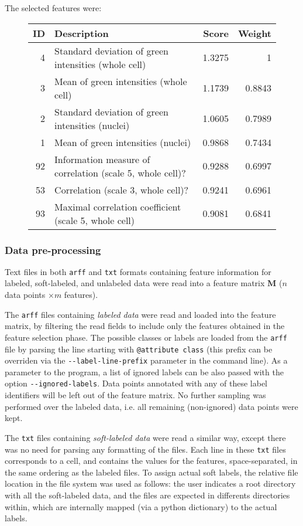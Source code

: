 \documentclass[oneside, a4paper, draft]{memoir} %
\begin{document}
The selected features were: 

\begin{figure}[here]
\centering
\begin{tabular}{rlrr}
	ID & Description & Score & Weight\\
	\hline
	4 & Standard deviation of green intensities (whole cell) & 1.3275 & 1\\
	3 & Mean of green intensities (whole cell) & 1.1739 & 0.8843\\
	2 & Standard deviation of green intensities (nuclei) & 1.0605 & 0.7989\\
	1 & Mean of green intensities (nuclei) & 0.9868 & 0.7434\\
	92 & Information measure of correlation (scale 5, whole cell)? & 0.9288 & 0.6997\\
    53 & Correlation (scale 3, whole cell)? & 0.9241 & 0.6961\\
	93 & Maximal correlation coefficient (scale 5, whole cell) & 0.9081 & 0.6841
\end{tabular}
\end{figure}

\subsubsection{Data pre-processing}
Text files in both \texttt{arff} and \texttt{txt} formats containing feature information for labeled, soft-labeled,
and unlabeled data were read into a feature matrix $\mathbf M$ ($n$ data points $\times m$ features).

The \texttt{arff} files containing \emph{labeled data} were read and loaded into the feature matrix, by filtering the
read fields to include only the features obtained in the feature selection phase. The possible classes or labels are
loaded from the \texttt{arf{}f} file by parsing the line starting with \texttt{@attribute class} (this prefix can be
overriden via the \texttt{-{}-label-line-prefix} parameter in the command line). As a parameter to the program, a list
of ignored labels can be also passed with the option \texttt{-{}-ignored-labels}. Data points annotated with any of
these label identifiers will be left out of the feature matrix. No further sampling was performed over the labeled
data, i.e. all remaining (non-ignored) data points were kept.

The \texttt{txt} files containing \emph{soft-labeled data} were read a similar way, except there was no need for
parsing any formatting of the files. Each line in these \texttt{txt} files corresponds to a cell, and contains the
values for the features, space-separated, in the same ordering as the labeled files. To assign actual soft labels, the
relative file location in the file system was used as follows: the user indicates a root directory with all the 
soft-labeled data, and the files are expected in differents directories within, which are internally mapped 
(via a python dictionary) to the actual labels.
\end{document}
